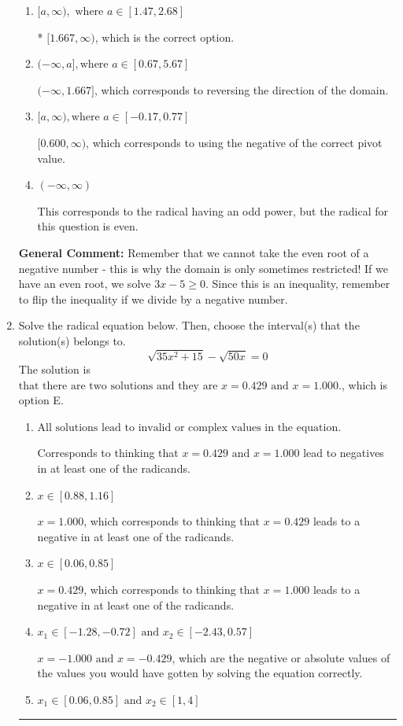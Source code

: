 \documentclass{extbook}[14pt]
\newcommand{\litem}[1]{\item #1

\rule{\textwidth}{0.4pt}}
\begin{document}
\begin{enumerate}
{\begin{enumerate}[label=\Alph*.]
$(-\infty, 0.600]$, which corresponds to reversing the direction of the domain AND using the negative of the correct pivot value.
\item \( [a, \infty), \text{ where } a \in [1.47, 2.68] \)

* $[1.667, \infty)$, which is the correct option.
\item \( (-\infty, a], \text{where } a \in [0.67, 5.67] \)

 $(-\infty, 1.667]$, which corresponds to reversing the direction of the domain.
\item \( [a, \infty), \text{where } a \in [-0.17, 0.77] \)

$[0.600, \infty)$, which corresponds to using the negative of the correct pivot value.
\item \( (-\infty, \infty) \)

This corresponds to the radical having an odd power, but the radical for this question is even.
\end{enumerate}

\textbf{General Comment:} Remember that we cannot take the even root of a negative number - this is why the domain is only sometimes restricted! If we have an even root, we solve $3 x - 5 \geq 0$. Since this is an inequality, remember to flip the inequality if we divide by a negative number.
}
\litem{
Solve the radical equation below. Then, choose the interval(s) that the solution(s) belongs to.
\[ \sqrt{35 x^2 + 15} - \sqrt{50 x} = 0 \]The solution is \( \text{that there are two solutions and they are } x = 0.429 \text{ and } x = 1.000. \), which is option E.\begin{enumerate}[label=\Alph*.]
\item \( \text{All solutions lead to invalid or complex values in the equation.} \)

Corresponds to thinking that $x = 0.429 \text{ and } x = 1.000$ lead to negatives in at least one of the radicands.
\item \( x \in [0.88,1.16] \)

$x = 1.000$, which corresponds to thinking that $x = 0.429$ leads to a negative in at least one of the radicands.
\item \( x \in [0.06,0.85] \)

$x = 0.429$, which corresponds to thinking that $x = 1.000$ leads to a negative in at least one of the radicands.
\item \( x_1 \in [-1.28, -0.72] \text{ and } x_2 \in [-2.43,0.57] \)

$x = -1.000 \text{ and } x = -0.429$, which are the negative or absolute values of the values you would have gotten by solving the equation correctly.
\item \( x_1 \in [0.06, 0.85] \text{ and } x_2 \in [1,4] \)


\end{enumerate}}
\end{enumerate}
\end{document}
